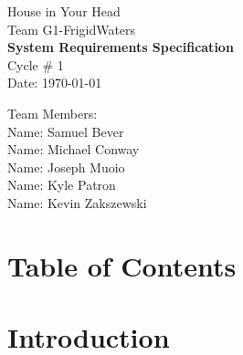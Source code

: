 \documentclass{article}
\begin{document}
\begin{titlepage}
    \begin{center}
        \begin{huge}
        House in Your Head \\[1cm]
        Team G1-FrigidWaters \\[2.2cm]
        { \bfseries System Requirements Specification } \\[1cm]
        Cycle \# 1\\[2.2cm]
        Date: \required\today\\[1cm]
        \end{huge}
    \end{center}
    \null \vfill
    \begin{large}
        Team Members: \\[0.5cm]
        Name: Samuel Bever\\[0.5cm]
        Name: Michael Conway\\[0.5cm]
        Name: Joseph Muoio\\[0.5cm]
        Name: Kyle Patron\\[0.5cm]
        Name: Kevin Zakszewski
    \end{large}
\end{titlepage}
\section*{\centering Table of Contents}
\makeatletter
{}
\newcommand{\hsubsubsection}{
\@startsection{subsubsection}{3}{\z@}%
                                     {-3.25ex\@plus -1ex \@minus -.2ex}%
                                     {-1.5ex \@plus -.2ex}%
                                     {R\normalfont\normalsize}}
\newcommand{\hparagraph}{
\@startsection{paragraph}{4}{\z@}%
                                     {-3.25ex\@plus -1ex \@minus -.2ex}%
                                     {-1.5ex \@plus -.2ex}%
                                     {R\normalfont\normalsize}}
\newcommand{\hsubparagraph}{
\@startsection{subparagraph}{5}{\z@}%
                                     {-3.25ex\@plus -1ex \@minus -.2ex}%
                                     {-1.5ex \@plus -.2ex}%
                                     {R\normalfont\normalsize}}
\setcounter{secnumdepth}{5}
\makeatother
\newpage
 

\section{Introduction}
\end{document}
